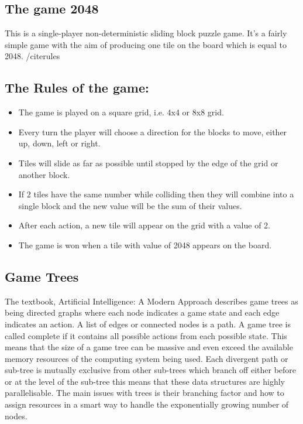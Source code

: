 \documentclass[a4paper]{report}
\begin{document}
\subsection{The game 2048}
This is a single-player non-deterministic sliding block puzzle game. It’s a fairly simple game with the aim of producing one tile on the board which is equal to 2048. /cite{rules}

\subsection{The Rules of the game:}
	\begin{itemize}
		\item The game is played on a square grid, i.e. 4x4 or 8x8 grid.
		\item Every turn the player will choose a direction for the blocks to move, either up, down, left or right.
		\item Tiles will slide as far as possible until stopped by the edge of the grid or another block. 
		\item If 2 tiles have the same number while colliding then they will combine into a single block and the new value will be the sum of their values.
		\item After each action, a new tile will appear on the grid with a value of 2.
		\item The game is won when a tile with value of 2048 appears on the board. 
	\end{itemize}

\subsection{Game Trees}
The textbook, Artificial Intelligence: A Modern Approach \cite{AIModern} describes game trees as being directed graphs where each node indicates a game state and each edge indicates an action. A list of edges or connected nodes is a path. A game tree is called complete if it contains all possible actions from each possible state. This means that the size of a game tree can be massive and even exceed the available memory resources of the computing system being used. Each divergent path or sub-tree is mutually exclusive from other sub-trees which branch off either before or at the level of the sub-tree this means that these data structures are highly parallelisable. The main issues with trees is their branching factor and how to assign resources in a smart way to handle the exponentially growing number of nodes.
\end{document}
